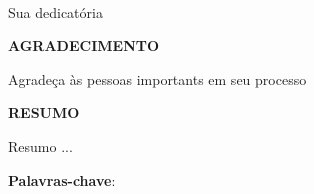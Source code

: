 \documentclass[12pt,a4paper,chapter=TITLE,section=TITLE]{article}
\numberwithin{equation}{subsection}
\numberwithin{figure}{subsection}
\numberwithin{table}{subsection}
\begin{document}




\vspace{\fill}
\begin{minipage}[t][5cm][b]{0,3\textwidth}
	$ \ $
\end{minipage}
\begin{minipage}[t][15cm][b]{0,6\textwidth}
	 \noindent Sua dedicatória
\end{minipage}
\vspace{3cm}
\thispagestyle{empty}
\newpage


\begin{center}
	\textbf{\large AGRADECIMENTO}
\end{center}

Agradeça às pessoas importants em seu processo

\thispagestyle{empty}
\newpage


\begin{center}
	\textbf{\large RESUMO}
\end{center}

Resumo ...

\vspace{1pt}

\noindent \textbf{Palavras-chave}: 

\thispagestyle{empty}
\newpage

\end{document}
